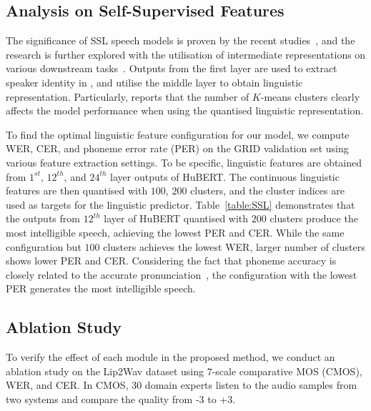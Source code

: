 \documentclass[letterpaper]{article} %
\begin{document}
\subsection{Analysis on Self-Supervised Features}
The significance of SSL speech models is proven by the recent studies~\cite{baevski2020wav2vec,hsu2021hubert}, and the research is further explored with the utilisation of intermediate representations on various downstream tasks~\cite{yang21c_interspeech,chang2022distilhubert}. 
Outputs from the first layer are used to extract speaker identity in \cite{fan2020exploring,choi2021neural}, and \cite{lakhotia2021generative,lee2022hierspeech} utilise the middle layer to obtain linguistic representation.
Particularly, \cite{lakhotia2021generative} reports that the number of $K$-means clusters clearly affects the model performance when using the quantised linguistic representation.

To find the optimal linguistic feature configuration for our model, we compute WER, CER, and phoneme error rate (PER) on the GRID validation set using various feature extraction settings. 
To be specific, linguistic features are obtained from $1^{st}$, $12^{th}$, and $24^{th}$ layer outputs of HuBERT. The continuous linguistic features are then quantised with $100$, $200$ clusters, and the cluster indices are used as targets for the linguistic predictor.
Table~\ref{table:SSL} demonstrates that the outputs from $12^{th}$ layer of HuBERT quantised with $200$ clusters produce the most intelligible speech, achieving the lowest PER and CER. 
While the same configuration but $100$ clusters achieves the lowest WER, larger number of clusters shows lower PER and CER. Considering the fact that phoneme accuracy is closely related to the accurate pronunciation~\cite{zhang2022mixed}, the configuration with the lowest PER generates the most intelligible speech. 

\subsection{Ablation Study}
\label{sec:ablation}

To verify the effect of each module in the proposed method, we conduct an ablation study on the Lip2Wav dataset using $7$-scale comparative MOS (CMOS), WER, and CER.
In CMOS, 30 domain experts listen to the audio samples from two systems and compare the quality from -$3$ to +$3$.
\end{document}
